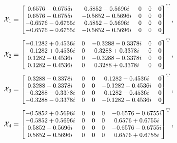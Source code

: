 \documentclass[journal]{IEEEtran}
\begin{document}
        
 \begin{equation}
  \footnotesize   
     \mathcal X_1=
\begin{bmatrix}
   0.6576 + 0.6755i&  0.5852 - 0.5696i&  0&  0&  0\\
   0.6576 + 0.6755i& -0.5852 + 0.5696i&  0&  0&  0\\
  -0.6576 - 0.6755i&  0.5852 - 0.5696i&  0&  0&  0\\
  -0.6576 - 0.6755i& -0.5852 + 0.5696i&  0&  0&  0\\
      \end{bmatrix}^{\text{T}}, \notag
  \end{equation}
\begin{equation}
  \footnotesize   
     \mathcal X_2=
\begin{bmatrix}
  -0.1282 + 0.4536i&  0& -0.3288 - 0.3378i&  0&  0\\
  -0.1282 + 0.4536i&  0&  0.3288 + 0.3378i&  0&  0\\
   0.1282 - 0.4536i&  0& -0.3288 - 0.3378i&  0&  0\\
   0.1282 - 0.4536i&  0&  0.3288 + 0.3378i&  0&  0\\

      \end{bmatrix}^{\text{T}}, \notag
  \end{equation}
 \begin{equation}
  \footnotesize   
     \mathcal X_3=
\begin{bmatrix}
   0.3288 + 0.3378i&  0&  0&  0.1282 - 0.4536i&  0\\
   0.3288 + 0.3378i&  0&  0& -0.1282 + 0.4536i&  0\\
  -0.3288 - 0.3378i&  0&  0&  0.1282 - 0.4536i&  0\\
  -0.3288 - 0.3378i&  0&  0& -0.1282 + 0.4536i&  0\\

      \end{bmatrix}^{\text{T}}, \notag
  \end{equation}
\begin{equation}
  \footnotesize   
     \mathcal X_4=
\begin{bmatrix}
  -0.5852 + 0.5696i&  0&  0&  0& -0.6576 - 0.6755i\\
  -0.5852 + 0.5696i&  0&  0&  0&  0.6576 + 0.6755i\\
   0.5852 - 0.5696i&  0&  0&  0& -0.6576 - 0.6755i\\
   0.5852 - 0.5696i&  0&  0&  0&  0.6576 + 0.6755i\\
      \end{bmatrix}^{\text{T}}, \notag
  \end{equation}
\end{document}
